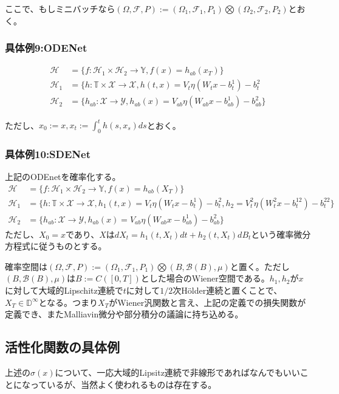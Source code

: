 \documentclass{jsarticle}
\begin{document}
ここで、もしミニバッチなら$(\Omega,\mathcal{F},P):=(\Omega_1,\mathcal{F}_1,P_1)\bigotimes(\Omega_2,\mathcal{F}_2,P_2)$とおく。

\subsubsection{具体例9:ODENet}
\begin{align}
\mathcal{H}&=\{f:\mathcal{H}_1\times\mathcal{H}_2\to\mathbb{Y},f(x)=h_{ab}(x_T)\}\\
\mathcal{H}_1&=\{h:\mathbb{T}\times\mathcal{X}\to\mathcal{X},h(t,x)=V_t\eta(W_tx-b^1_t)-b_t^2\\
\mathcal{H}_2&=\{h_{ab}:\mathcal{X}\to\mathcal{Y},h_{ab}(x)=V_{ab}\eta(W_{ab}x-b^1_{ab})-b^2_{ab}\}
\end{align}

ただし、$x_0:=x,x_t:=\int^t_0 h(s,x_s)ds$とおく。

\subsubsection{具体例10:SDENet}
上記のODEnetを確率化する。
\begin{align}
\mathcal{H}&=\{f:\mathcal{H}_1\times\mathcal{H}_2\to\mathbb{Y},f(x)=h_{ab}(X_T)\}\\
\mathcal{H}_1&=\{h:\mathbb{T}\times\mathcal{X}\to\mathcal{X},h_1(t,x)=V_t\eta(W_tx-b^1_t)-b_t^2,h_2=V^2_t\eta(W^2_tx-b^{12}_t)-b_t^{22}\}\\
\mathcal{H}_2&=\{h_{ab}:\mathcal{X}\to\mathcal{Y},h_{ab}(x)=V_{ab}\eta(W_{ab}x-b^1_{ab})-b^2_{ab}\}
\end{align}
ただし、$X_0=x$であり、$X$は$dX_t=h_1(t,X_t)dt+h_2(t,X_t)dB_t$という確率微分方程式に従うものとする。

確率空間は$(\Omega,\mathcal{F},P):=(\Omega_1,\mathcal{F}_1,P_1)\bigotimes(B,\mathcal{B}(B),\mu)$と置く。ただし$(B,\mathcal{B}(B),\mu)$は$B:=C([0,T])$とした場合のWiener空間である。$h_1,h_2$が$x$に対して大域的Lipschitz連続で$t$に対して$1/2$次Hölder連続と置くことで、$X_T\in\mathbb{D}^\infty$となる。つまり$X_T$がWiener汎関数と言え、上記の定義での損失関数が定義でき、またMalliavin微分や部分積分の議論に持ち込める。



\subsection{活性化関数の具体例}
上述の$\sigma(x)$について、一応大域的Lipsitz連続で非線形であればなんでもいいことになっているが、当然よく使われるものは存在する。
\end{document}
